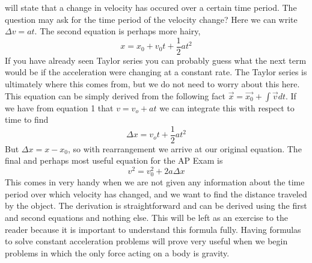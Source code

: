 will state that a change in velocity has occured over a certain time period. The question may ask for the time period of the velocity change? Here we can write $\Delta v= at$. The second equation is perhaps more hairy, \begin{equation}x = x_0 + v_0 t+\frac{1}{2}at^2\end{equation} If you have already seen Taylor series you can probably guess what the next term would be if the acceleration were changing at a constant rate. The Taylor series is ultimately where this comes from, but we do not need to worry about this here. This equation can be simply derived from the following fact $\vec{x}= \vec{x_0} + \int \vec{v} dt$.  If we have from equation 1 that $v = v_o+at$ we can integrate this with respect to time to find \begin{equation}\Delta x = v_ot+\frac{1}{2}at^2\end{equation} But $\Delta x = x-x_0$, so with rearrangement we arrive at our original equation. The final and perhaps most useful equation for the AP Exam is \begin{equation} v^2=v_0^2+2a \Delta x\end{equation} This comes in very handy when we are not given any information about the time period over which velocity has changed, and we want to find the distance traveled by the object. The derivation is straightforward and can be derived using the first and second equations and nothing else. This will be left as an exercise to the reader because it is important to understand this formula fully. Having formulas to solve constant acceleration problems will prove very useful when we begin problems in which the only force acting on a body is gravity. 
\newline
\newline
{}
\newline